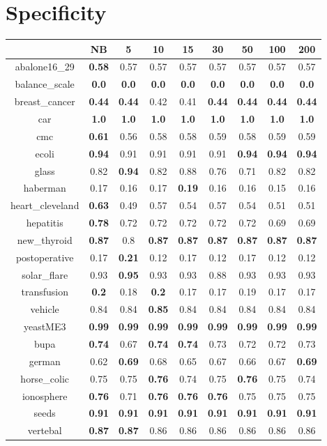 \documentclass{article}%
\begin{document}
%
\section*{Specificity}%
\begin{tabular}{c|cccccccc}%
\hline%
&NB&5&10&15&30&50&100&200\\%
\hline%
abalone16\_29&\textbf{0.58}&0.57&0.57&0.57&0.57&0.57&0.57&0.57\\%
\hline%
balance\_scale&\textbf{0.0}&\textbf{0.0}&\textbf{0.0}&\textbf{0.0}&\textbf{0.0}&\textbf{0.0}&\textbf{0.0}&\textbf{0.0}\\%
\hline%
breast\_cancer&\textbf{0.44}&\textbf{0.44}&0.42&0.41&\textbf{0.44}&\textbf{0.44}&\textbf{0.44}&\textbf{0.44}\\%
\hline%
car&\textbf{1.0}&\textbf{1.0}&\textbf{1.0}&\textbf{1.0}&\textbf{1.0}&\textbf{1.0}&\textbf{1.0}&\textbf{1.0}\\%
\hline%
cmc&\textbf{0.61}&0.56&0.58&0.58&0.59&0.58&0.59&0.59\\%
\hline%
ecoli&\textbf{0.94}&0.91&0.91&0.91&0.91&\textbf{0.94}&\textbf{0.94}&\textbf{0.94}\\%
\hline%
glass&0.82&\textbf{0.94}&0.82&0.88&0.76&0.71&0.82&0.82\\%
\hline%
haberman&0.17&0.16&0.17&\textbf{0.19}&0.16&0.16&0.15&0.16\\%
\hline%
heart\_cleveland&\textbf{0.63}&0.49&0.57&0.54&0.57&0.54&0.51&0.51\\%
\hline%
hepatitis&\textbf{0.78}&0.72&0.72&0.72&0.72&0.72&0.69&0.69\\%
\hline%
new\_thyroid&\textbf{0.87}&0.8&\textbf{0.87}&\textbf{0.87}&\textbf{0.87}&\textbf{0.87}&\textbf{0.87}&\textbf{0.87}\\%
\hline%
postoperative&0.17&\textbf{0.21}&0.12&0.17&0.12&0.17&0.12&0.12\\%
\hline%
solar\_flare&0.93&\textbf{0.95}&0.93&0.93&0.88&0.93&0.93&0.93\\%
\hline%
transfusion&\textbf{0.2}&0.18&\textbf{0.2}&0.17&0.17&0.19&0.17&0.17\\%
\hline%
vehicle&0.84&0.84&\textbf{0.85}&0.84&0.84&0.84&0.84&0.84\\%
\hline%
yeastME3&\textbf{0.99}&\textbf{0.99}&\textbf{0.99}&\textbf{0.99}&\textbf{0.99}&\textbf{0.99}&\textbf{0.99}&\textbf{0.99}\\%
\hline%
bupa&\textbf{0.74}&0.67&\textbf{0.74}&\textbf{0.74}&0.73&0.72&0.72&0.73\\%
\hline%
german&0.62&\textbf{0.69}&0.68&0.65&0.67&0.66&0.67&\textbf{0.69}\\%
\hline%
horse\_colic&0.75&0.75&\textbf{0.76}&0.74&0.75&\textbf{0.76}&0.75&0.74\\%
\hline%
ionosphere&\textbf{0.76}&0.71&\textbf{0.76}&\textbf{0.76}&\textbf{0.76}&0.75&0.75&0.75\\%
\hline%
seeds&\textbf{0.91}&\textbf{0.91}&\textbf{0.91}&\textbf{0.91}&\textbf{0.91}&\textbf{0.91}&\textbf{0.91}&\textbf{0.91}\\%
\hline%
vertebal&\textbf{0.87}&\textbf{0.87}&0.86&0.86&0.86&0.86&0.86&0.86\\%
\hline%
\end{tabular}
\end{document}

